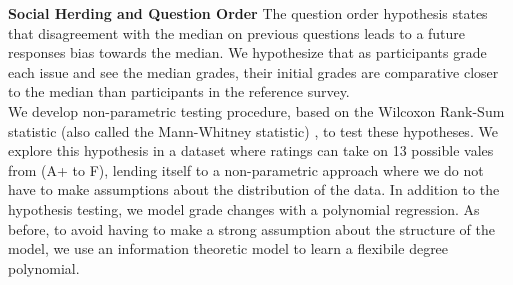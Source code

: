 \noindent \textbf{Social Herding and Question Order} The question order hypothesis states that disagreement with the median on previous questions leads to a future responses bias towards the median. We hypothesize that as participants grade each issue and see the median grades, their initial grades are comparative closer to the median than participants in the reference survey.\\[1\baselineskip]
We develop non-parametric testing procedure, based on the Wilcoxon Rank-Sum statistic (also called the Mann-Whitney statistic) \cite{lehmann2006nonparametrics}, to test these hypotheses.
We explore this hypothesis in a dataset where ratings can take on 13 possible vales from (A+ to F), lending itself to a non-parametric approach where we do not have to make assumptions about the distribution of the data.
In addition to the hypothesis testing, we model grade changes with a polynomial regression.
As before, to avoid having to make a strong assumption about the structure of the model, we use an information theoretic model to learn a flexibile degree polynomial.

